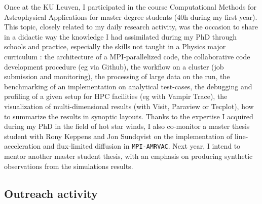 \documentclass[a4paper,12pt,onecolumn]{article}
\begin{document}
\indent Once at the KU Leuven, I participated in the course Computational Methods for Astrophysical Applications for master degree students (40h during my first year). This topic, closely related to my daily research activity, was the occasion to share in a didactic way the knowledge I had assimilated during my PhD through schools and practice, especially the skills not taught in a Physics major curriculum : the architecture of a MPI-parallelized code, the collaborative code development procedure (eg via Github), the workflow on a cluster (job submission and monitoring), the processing of large data on the run, the benchmarking of an implementation on analytical test-cases, the debugging and profiling of a given setup for HPC facilities (eg with Vampir Trace), the visualization of multi-dimensional results (with Visit, Paraview or Tecplot), how to summarize the results in synoptic layouts. Thanks to the expertise I acquired during my PhD in the field of hot star winds, I also co-monitor a master thesis student with Rony Keppens and Jon Sundqvist on the implementation of line-acceleration and flux-limited diffusion in \texttt{MPI-AMRVAC}. Next year, I intend to mentor another master student thesis, with an emphasis on producing synthetic observations from the simulations results.

%

\newpage

\subsection*{Outreach activity}
\end{document}
